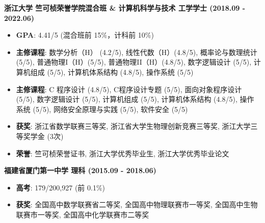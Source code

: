     \noindent\textbf{浙江大学 \textbar{} 竺可桢荣誉学院混合班 \& 计算机科学与技术 \textbar{} 工学学士 (2018.09 - 2022.06)}

    \begin{itemize}
        \item \textbf{GPA}: 4.41/5 (混合班前 15\%，计科前 10\%)
              \ifdefined\qr
        \item \textbf{主修课程}: 数学分析（H） (4.2/5), 线性代数（H）(4.8/5), 概率论与数理统计(5/5), 普通物理I（H）(5/5), 普通物理II（H）(4.8/5), 数字逻辑设计 (5/5), 计算机组成 (5/5), 计算机体系结构 (4.8/5), 操作系统 (5/5)
              \else
        \item \textbf{主修课程}: C 程序设计 (4.8/5), C程序设计专题 (5/5), 面向对象程序设计 (5/5), 数字逻辑设计 (5/5), 计算机组成 (5/5), 计算机体系结构 (4.8/5), 操作系统 (5/5), 网络安全原理与实践 (5/5), 软件安全 (5/5)
              \fi
        \item \textbf{获奖}: 浙江省数学联赛三等奖, 浙江省大学生物理创新竞赛三等奖, 浙江大学三等奖学金 (3次)
        \item \textbf{荣誉}: 竺可桢荣誉证书, 浙江大学优秀毕业生, 浙江大学优秀毕业论文
    \end{itemize}

    \noindent\textbf{福建省厦门第一中学 \textbar{} 理科 (2015.09 - 2018.06)}

    \begin{itemize}
        \item \textbf{高考}: 179/200,927 (前 0.1\%)
        \item \textbf{获奖}: 全国高中数学联赛省二等奖, 全国高中物理联赛市一等奖, 全国高中生物联赛市一等奖, 全国高中化学联赛市二等奖
    \end{itemize}

\fi

